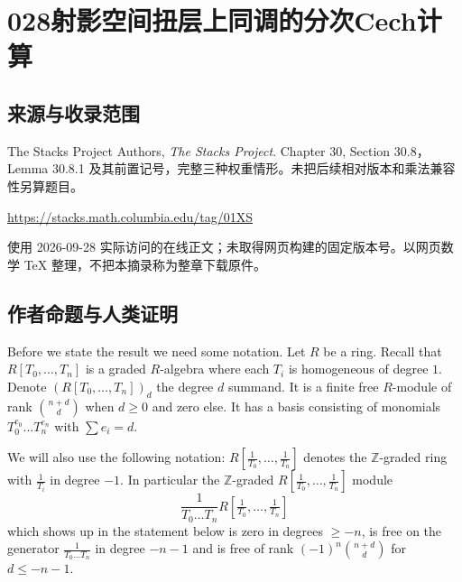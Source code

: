 \documentclass[UTF8,11pt]{ctexart}
\theoremstyle{definition}
\newcommand{\Z}{\mathbb Z}
\begin{document}
\section*{028\quad 射影空间扭层上同调的分次Cech计算}
\subsection*{来源与收录范围}
The Stacks Project Authors, \emph{The Stacks Project}. Chapter 30, Section 30.8，Lemma 30.8.1 及其前置记号，完整三种权重情形。未把后续相对版本和乘法兼容性另算题目。
\par\url{https://stacks.math.columbia.edu/tag/01XS}
\par 使用 2026-09-28 实际访问的在线正文；未取得网页构建的固定版本号。以网页数学 TeX 整理，不把本摘录称为整章下载原件。
\subsection*{作者命题与人类证明}
Before we state the result we need some notation. Let $R$ be a ring. Recall that $R[T_0,\ldots,T_n]$ is a graded $R$-algebra where each $T_i$ is homogeneous of degree $1$. Denote $(R[T_0,\ldots,T_n])_d$ the degree $d$ summand. It is a finite free $R$-module of rank $\binom{n+d}{d}$ when $d\geq0$ and zero else. It has a basis consisting of monomials $T_0^{e_0}\ldots T_n^{e_n}$ with $\sum e_i=d$.

We will also use the following notation: $R[\frac1{T_0},\ldots,\frac1{T_n}]$ denotes the $\Z$-graded ring with $\frac1{T_i}$ in degree $-1$. In particular the $\Z$-graded $R[\frac1{T_0},\ldots,\frac1{T_n}]$ module
\[
\frac1{T_0\ldots T_n}R[\tfrac1{T_0},\ldots,\tfrac1{T_n}]
\]
which shows up in the statement below is zero in degrees $\geq-n$, is free on the generator $\frac1{T_0\ldots T_n}$ in degree $-n-1$ and is free of rank $(-1)^n\binom{n+d}{d}$ for $d\leq-n-1$.
\end{document}
